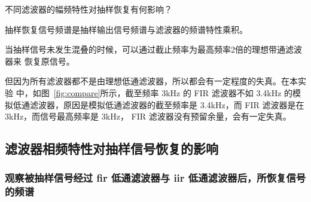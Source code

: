 \documentclass[../main]{subfiles}
\begin{document}

\begin{Exercise}[title = 思考, label = ex:filter]
  不同滤波器的幅频特性对抽样恢复有何影响？
\end{Exercise}

\begin{Answer}
  抽样恢复信号频谱是抽样输出信号频谱与滤波器的频谱特性乘积。

  当抽样信号未发生混叠的时候，可以通过截止频率为最高频率2倍的理想带通滤波器来
  恢复原信号。

  但因为所有滤波器都不是由理想低通滤波器，所以都会有一定程度的失真。在本实验
  中，如图~\ref{fig:compare}所示，截至频率 3kHz 的 FIR 滤波器不如 3.4kHz 的模
  拟低通滤波器，原因是模拟低通滤波器的截至频率是 3.4kHz，而 FIR 滤波器是在
  3kHz，而信号最高频率是 3kHz， FIR 滤波器没有预留余量，会有一定失真。
\end{Answer}

\subsection{滤波器相频特性对抽样信号恢复的影响}%
\label{sub:phase}


\subsubsection{观察被抽样信号经过 fir 低通滤波器与 iir 低通滤波器后，所恢复信号的频谱}%
\label{ssub:freq}

\end{document}
